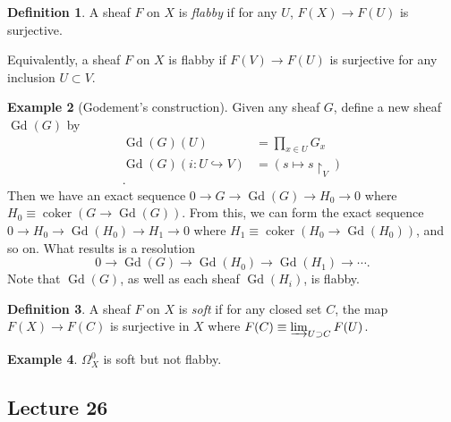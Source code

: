 \documentclass[10pt,letterpaper,cm]{nupset}
\theoremstyle{definition}
\newtheorem{definition}{Definition}[subsection]
\newtheorem{exmp}[definition]{Example}
\theoremstyle{theorem}
\theoremstyle{remark}
\newcommand{\1}{\mathbb{1}}
\newcommand{\0}{\vec 0}
\DeclareMathOperator{\Gd}{Gd}
\DeclareMathOperator{\coker}{coker}
\begin{document}
\begin{definition}
A sheaf $F$ on $X$ is \textit{flabby} if for any $U$, $F(X) \to F(U)$ is surjective. 
\end{definition}

Equivalently, a sheaf $F$ on $X$ is flabby if $F(V) \to F(U)$ is surjective for any inclusion $U \subset V$.

\begin{exmp}[Godement's construction]
Given any sheaf $G$, define a new sheaf $\Gd(G)$ by 
\begin{align*}
\Gd(G)(U) & =  \prod_{x\in U}G_x
\\
\Gd(G)(i : U \hookrightarrow V) & = \left(s \mapsto s \restriction_V\right)\\ 
.\end{align*} Then we have an exact sequence $0 \to G \to \Gd(G) \to H_0 \to 0$ where $H_0 \equiv \coker(G \to \Gd(G))$. From this, we can form the exact sequence $0 \to H_0 \to \Gd(H_0) \to H_1 \to 0$ where $H_1 \equiv \coker(H_0 \to \Gd(H_0))$, and so on. What results is a resolution $$ 0 \to \Gd(G) \to \Gd(H_0) \to \Gd(H_1) \to \cdots    .$$  Note that $\Gd(G)$, as well as each sheaf $\Gd(H_i)$, is flabby. 
\end{exmp}

\begin{definition}
A sheaf $F$ on $X$ is \textit{soft} if  for any closed set $C$, the map $F(X) \to F(C)$ is surjective in $X$ where $F(C) \equiv \varinjlim_{U \supset C}F(U)$. 
\end{definition}

\begin{exmp}
$\Omega^0_X$ is soft but not flabby. 
\end{exmp}

\subsection{Lecture 26}
\end{document}
